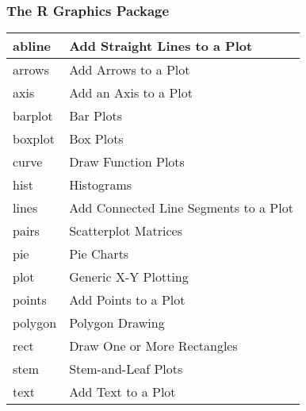 \documentclass{beamer}
\begin{document}
\begin{frame}
    \frametitle{The R Graphics Package} 

{\scriptsize
\begin{center}
\begin{tabular}{|l|l|}
 \hline
abline &	Add Straight Lines to a Plot \\ \hline
arrows &	Add Arrows to a Plot \\ \hline
axis	& Add an Axis to a Plot \\ \hline
barplot	 & Bar Plots \\ \hline
boxplot &	Box Plots \\ \hline
curve &	Draw Function Plots \\ \hline
hist &	Histograms \\ \hline
lines &	Add Connected Line Segments to a Plot \\ \hline
pairs &	Scatterplot Matrices \\ \hline
pie & 	Pie Charts \\ \hline
plot &	Generic X-Y Plotting \\ \hline
points &	Add Points to a Plot \\ \hline
polygon &	Polygon Drawing \\ \hline
rect &	Draw One or More Rectangles \\ \hline
stem	& Stem-and-Leaf Plots \\ \hline
text &	Add Text to a Plot \\ \hline
   \end{tabular}
 \end{center}
}

\end{frame}
\end{document}
